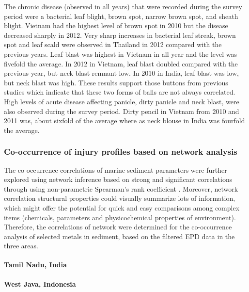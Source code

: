 The chronic disease (observed in all years) that were recorded during the survey period were a bacterial leaf blight, brown spot, narrow brown spot, and sheath blight. Vietnam had the highest level of brown spot in 2010 but the disease decreased sharply in 2012. Very sharp increases in bacterial leaf streak, brown spot and leaf scald were observed in Thailand in 2012 compared with the previous years. Leaf blast was highest in Vietnam in all year and the level was fivefold the average. In 2012 in Vietnam, leaf blast doubled compared with the previous year, but neck blast remnant low. In 2010 in India, leaf blast was low, but neck blast was high. These results support those buttons from previous studies which indicate that these two forms of balls are not always correlated. High levels of acute disease affecting panicle, dirty panicle and neck blast, were also observed during the survey period. Dirty pencil in Vietnam from 2010 and 2011 was, about sixfold of the average where as neck blouse in India was fourfold the average.





\subsubsection*{Co-occurrence of injury profiles based on network analysis}

The co-occurrence correlations of marine sediment parameters were further explored using network inference based on strong and significant correlations through using non-parametric Spearman’s rank coefficient . Moreover, network correlation structural properties could visually summarize lots of information, which might offer the potential for quick and easy comparisons among complex items (chemicals, parameters and physicochemical properties of environment). Therefore, the correlations of network were determined for the co-occurrence analysis of selected metals in sediment, based on the filtered EPD data in the three areas.


\paragraph{Tamil Nadu, India}

\paragraph{West Java, Indonesia}


